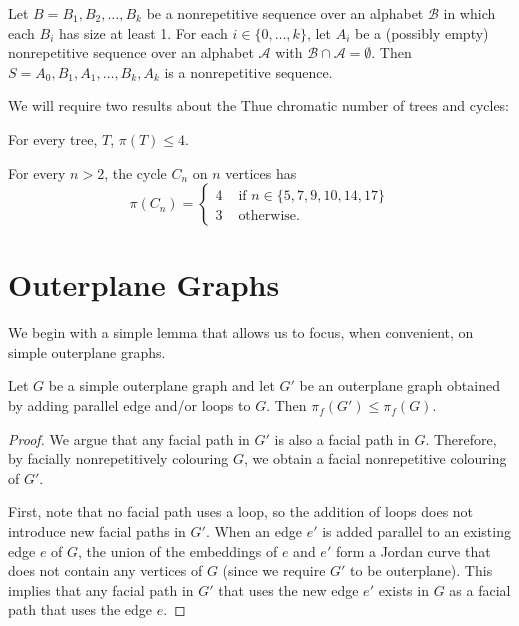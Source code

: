 \documentclass{patmorin}
\begin{document}
\begin{lem}
  Let $B=B_1,B_2,\ldots,B_k$ be a nonrepetitive sequence over an alphabet
  $\mathcal{B}$ in which each $B_i$ has size at least 1. For each $i
  \in \{0,\ldots,k\}$, let $A_i$ be a (possibly empty) nonrepetitive
  sequence over an alphabet $\mathcal{A}$ with $\mathcal{B} \cap
  \mathcal{A} = \emptyset$. Then $S = A_0, B_1, A_1, \ldots, B_k, A_k$
  is a nonrepetitive sequence.
\end{lem}

We will require two results about the Thue chromatic number of trees and cycles:

\begin{thm}
  For every tree, $T$, $\pi(T) \leq 4$.
\end{thm}

\begin{thm}
  For every $n>2$, the cycle $C_n$ on $n$ vertices has
  \[
  \pi(C_n) = \begin{cases}
              4 & \text{ if } n \in \{5,7,9,10,14,17\} \\
              3 & \text{ otherwise. }
             \end{cases}
  \]
\end{thm}

\section{Outerplane Graphs}

We begin with a simple lemma that allows us to focus, when convenient,
on simple outerplane graphs.

\begin{lem}
  Let $G$ be a simple outerplane graph and let $G'$ be an outerplane graph obtained by adding parallel edge and/or loops to $G$.  Then $\pi_f(G')\le\pi_f(G)$.
\end{lem}

\begin{proof}
   We argue that any facial path in $G'$ is also a facial path in $G$.
   Therefore, by facially nonrepetitively colouring $G$, we obtain a facial
   nonrepetitive colouring of $G'$.

   First, note that no facial path uses a loop, so the addition of
   loops does not introduce new facial paths in $G'$.  When an edge
   $e'$ is added parallel to an existing edge $e$ of $G$, the union
   of the embeddings of $e$ and $e'$ form a Jordan curve that does not
   contain any vertices of $G$ (since we require $G'$ to be outerplane).
   This implies that any facial path in $G'$ that uses the new edge $e'$
   exists in $G$ as a facial path that uses the edge $e$.
\end{proof}
\end{document}
